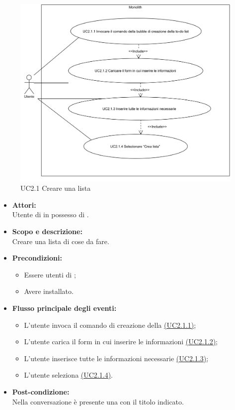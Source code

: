 \begin{figure}[H]
	\centering
	\includegraphics[width=15cm]{../../documenti/AnalisiDeiRequisiti/Diagrammi_img/uc2_1.png}
	\caption{UC2.1 Creare una lista}
\end{figure}

\begin{itemize}
	\item \textbf{Attori:}
	\\Utente di  in possesso di \ProjectName{}.
	\item \textbf{Scopo e descrizione:} 
	\\Creare una lista di cose da fare.
	\item \textbf{Precondizioni:}
	\begin{itemize}
		\item Essere utenti di ;
		\item Avere \ProjectName{} installato.
	\end{itemize}
	\item \textbf{Flusso principale degli eventi:}
	\begin{itemize}
		\item L'utente invoca il comando di creazione della   \hyperref[UC2.1.1]{(UC2.1.1)};
		\item L'utente carica il form in cui inserire le informazioni \hyperref[UC2.1.2]{(UC2.1.2)};
		\item L'utente inserisce tutte le informazioni necessarie \hyperref[UC2.1.3]{(UC2.1.3)};
		\item L'utente seleziona  \hyperref[UC2.1.4]{(UC2.1.4)}.
	\end{itemize}
	\item \textbf{Post-condizione:}
	\\Nella conversazione è presente una   con il titolo indicato.
\end{itemize}

